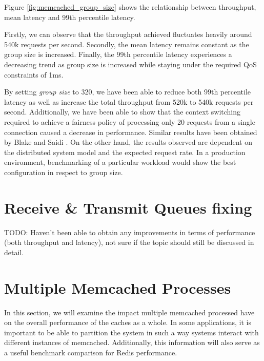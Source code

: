 Figure \ref{fig:memcached_group_size} shows the relationship between throughput, mean latency and 99th percentile latency.

Firstly, we can observe that the throughput achieved fluctuates heavily around 540k requests per second. Secondly, the mean latency remains constant as the group size is increased. Finally, the 99th percentile latency experiences a decreasing trend as group size is increased while staying under the required QoS constraints of 1ms.

By setting \textit{group size} to 320, we have been able to reduce both 99th percentile latency as well as increase the total throughput from 520k to 540k requests per second. Additionally, we have been able to show that the context switching required to achieve a fairness policy of processing only 20 requests from a single connection caused a decrease in performance. Similar results have been obtained by Blake and Saidi \cite{blake54does}. On the other hand, the results observed are dependent on the distributed system model and the expected request rate. In a production environment, benchmarking of a particular workload would show the best configuration in respect to group size.

\section{Receive \& Transmit Queues fixing}
TODO: Haven't been able to obtain any improvements in terms of performance (both throughput and latency), not sure if the topic should still be discussed in detail.


\section{Multiple Memcached Processes}

In this section, we will examine the impact multiple memcached processed have on the overall performance of the caches as a whole. In some applications, it is important to be able to partition the system in such a way systems interact with different instances of memcached. Additionally, this information will also serve as a useful benchmark comparison for Redis performance.